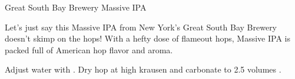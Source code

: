 \begin{recipie}{Great South Bay Brewery Massive IPA}

\begin{aboutblock}
Let's just say this Massive IPA from New York's Great South Bay Brewery doesn't skimp on
the hops! With a hefty dose of flameout hops, Massive IPA is packed full of American hop
flavor and aroma.
\end{aboutblock}


\begin{methodandtiming}
 
\begin{mashsteps}
\end{mashsteps}

\begin{directions}
Adjust water with  . Dry hop at high krausen and carbonate to 2.5 volumes .
\end{directions}

\end{methodandtiming}

\pagebreak

\begin{ingredientsblock}

\begin{malts}
\end{malts}

\begin{hops}
\end{hops}

\begin{yeasts}
\end{yeasts}

\end{ingredientsblock}

\end{recipie}

